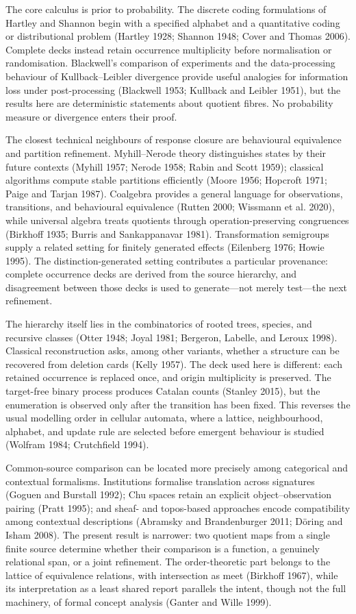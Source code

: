 \documentclass[11pt,a4paper]{article}
\begin{document}
The core calculus is prior to probability. The discrete coding
formulations of Hartley and Shannon begin with a specified alphabet and
a quantitative coding or distributional problem (Hartley 1928; Shannon
1948; Cover and Thomas 2006). Complete decks instead retain occurrence
multiplicity before normalisation or randomisation. Blackwell's
comparison of experiments and the data-processing behaviour of
Kullback--Leibler divergence provide useful analogies for information
loss under post-processing (Blackwell 1953; Kullback and Leibler 1951),
but the results here are deterministic statements about quotient fibres.
No probability measure or divergence enters their proof.

The closest technical neighbours of response closure are behavioural
equivalence and partition refinement. Myhill--Nerode theory
distinguishes states by their future contexts (Myhill 1957; Nerode 1958;
Rabin and Scott 1959); classical algorithms compute stable partitions
efficiently (Moore 1956; Hopcroft 1971; Paige and Tarjan 1987).
Coalgebra provides a general language for observations, transitions, and
behavioural equivalence (Rutten 2000; Wissmann et al. 2020), while
universal algebra treats quotients through operation-preserving
congruences (Birkhoff 1935; Burris and Sankappanavar 1981).
Transformation semigroups supply a related setting for finitely
generated effects (Eilenberg 1976; Howie 1995). The
distinction-generated setting contributes a particular provenance:
complete occurrence decks are derived from the source hierarchy, and
disagreement between those decks is used to generate---not merely
test---the next refinement.

The hierarchy itself lies in the combinatorics of rooted trees, species,
and recursive classes (Otter 1948; Joyal 1981; Bergeron, Labelle, and
Leroux 1998). Classical reconstruction asks, among other variants,
whether a structure can be recovered from deletion cards (Kelly 1957).
The deck used here is different: each retained occurrence is replaced
once, and origin multiplicity is preserved. The target-free binary
process produces Catalan counts (Stanley 2015), but the enumeration is
observed only after the transition has been fixed. This reverses the
usual modelling order in cellular automata, where a lattice,
neighbourhood, alphabet, and update rule are selected before emergent
behaviour is studied (Wolfram 1984; Crutchfield 1994).

Common-source comparison can be located more precisely among categorical
and contextual formalisms. Institutions formalise translation across
signatures (Goguen and Burstall 1992); Chu spaces retain an explicit
object--observation pairing (Pratt 1995); and sheaf- and topos-based
approaches encode compatibility among contextual descriptions (Abramsky
and Brandenburger 2011; Döring and Isham 2008). The present result is
narrower: two quotient maps from a single finite source determine
whether their comparison is a function, a genuinely relational span, or
a joint refinement. The order-theoretic part belongs to the lattice of
equivalence relations, with intersection as meet (Birkhoff 1967), while
its interpretation as a least shared report parallels the intent, though
not the full machinery, of formal concept analysis (Ganter and Wille
1999).
\end{document}
